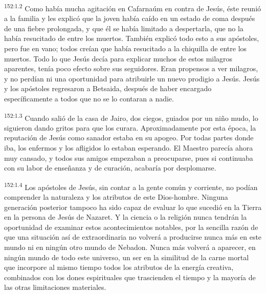 \par 
\textsuperscript{152:1.2} Como había mucha agitación en Cafarnaúm en contra de Jesús, éste reunió a la familia y les explicó que la joven había caído en un estado de coma después de una fiebre prolongada, y que él se había limitado a despertarla, que no la había resucitado de entre los muertos. También explicó todo esto a sus apóstoles, pero fue en vano; todos creían que había resucitado a la chiquilla de entre los muertos. Todo lo que Jesús decía para explicar muchos de estos milagros aparentes, tenía poco efecto sobre sus seguidores. Eran propensos a ver milagros, y no perdían ni una oportunidad para atribuirle un nuevo prodigio a Jesús. Jesús y los apóstoles regresaron a Betsaida, después de haber encargado específicamente a todos que no se lo contaran a nadie.

\par 
\textsuperscript{152:1.3} Cuando salió de la casa de Jairo, dos ciegos, guiados por un niño mudo, lo siguieron dando gritos para que los curara. Aproximadamente por esta época, la reputación de Jesús como sanador estaba en su apogeo. Por todas partes donde iba, los enfermos y los afligidos lo estaban esperando. El Maestro parecía ahora muy cansado, y todos sus amigos empezaban a preocuparse, pues si continuaba con su labor de enseñanza y de curación, acabaría por desplomarse.

\par 
\textsuperscript{152:1.4} Los apóstoles de Jesús, sin contar a la gente común y corriente, no podían comprender la naturaleza y los atributos de este Dios-hombre. Ninguna generación posterior tampoco ha sido capaz de evaluar lo que sucedió en la Tierra en la persona de Jesús de Nazaret. Y la ciencia o la religión nunca tendrán la oportunidad de examinar estos acontecimientos notables, por la sencilla razón de que una situación así de extraordinaria no volverá a producirse nunca más en este mundo ni en ningún otro mundo de Nebadon. Nunca más volverá a aparecer, en ningún mundo de todo este universo, un ser en la similitud de la carne mortal que incorpore al mismo tiempo todos los atributos de la energía creativa, combinados con los dones espirituales que trascienden el tiempo y la mayoría de las otras limitaciones materiales.

